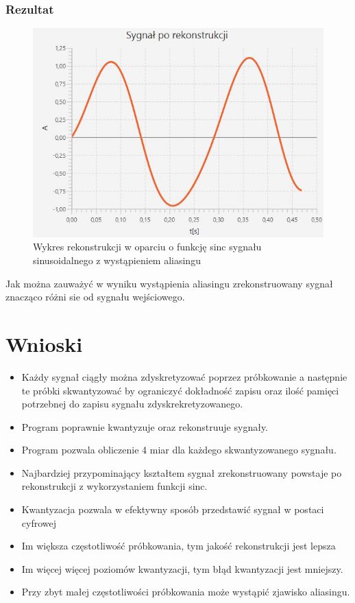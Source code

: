 \documentclass[12pt]{article}
\begin{document}
\subsubsection{Rezultat}
\begin{figure}[H]
	\centering
	\includegraphics{cps_aliasing.jpg}
	\caption{Wykres rekonstrukcji w oparciu o funkcję sinc sygnału sinusoidalnego z wystąpieniem aliasingu}
	\label{wykres dla eksperymentu 6}
\end{figure}

Jak można zauważyć w wyniku wystąpienia aliasingu zrekonstruowany sygnał znacząco różni sie od sygnału wejściowego.

\section{Wnioski}
\begin{itemize}
    \item Każdy sygnał ciągły można zdyskretyzować poprzez próbkowanie a następnie te próbki skwantyzować by ograniczyć dokładność zapisu oraz ilość pamięci potrzebnej do zapisu sygnału zdyskrekretyzowanego.
    \item Program poprawnie kwantyzuje oraz rekonstruuje sygnały.
    \item Program pozwala obliczenie 4 miar dla każdego skwantyzowanego sygnału.
    \item Najbardziej przypominający kształtem sygnał zrekonstruowany powstaje po rekonstrukcji z wykorzystaniem funkcji sinc.
    \item Kwantyzacja pozwala w efektywny sposób przedstawić sygnał w postaci cyfrowej
    \item Im większa częstotliwość próbkowania, tym jakość rekonstrukcji jest lepsza
    \item Im więcej więcej poziomów kwantyzacji, tym błąd kwantyzacji jest mniejszy.
    \item Przy zbyt małej częstotliwości próbkowania może wystąpić zjawisko aliasingu.
\end{itemize}
 
\end{document}

